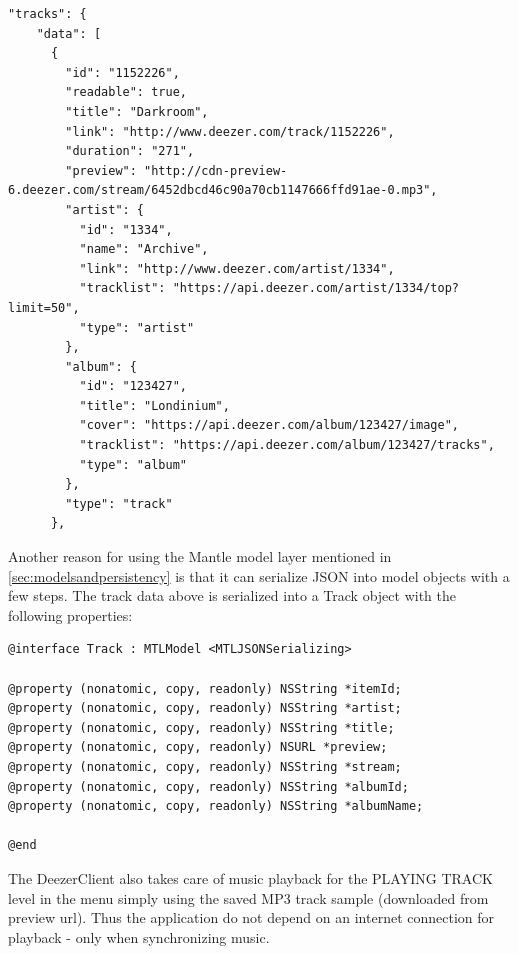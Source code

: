 \begin{lstlisting}
"tracks": {
    "data": [
      {
        "id": "1152226",
        "readable": true,
        "title": "Darkroom",
        "link": "http://www.deezer.com/track/1152226",
        "duration": "271",
        "preview": "http://cdn-preview-6.deezer.com/stream/6452dbcd46c90a70cb1147666ffd91ae-0.mp3",
        "artist": {
          "id": "1334",
          "name": "Archive",
          "link": "http://www.deezer.com/artist/1334",
          "tracklist": "https://api.deezer.com/artist/1334/top?limit=50",
          "type": "artist"
        },
        "album": {
          "id": "123427",
          "title": "Londinium",
          "cover": "https://api.deezer.com/album/123427/image",
          "tracklist": "https://api.deezer.com/album/123427/tracks",
          "type": "album"
        },
        "type": "track"
      },
\end{lstlisting}

Another reason for using the Mantle model layer mentioned in \ref{sec:modelsandpersistency} is that it can serialize JSON into model objects with a few steps. The track data above is serialized into a Track object with the following properties:

\begin{lstlisting}
@interface Track : MTLModel <MTLJSONSerializing>

@property (nonatomic, copy, readonly) NSString *itemId;
@property (nonatomic, copy, readonly) NSString *artist;
@property (nonatomic, copy, readonly) NSString *title;
@property (nonatomic, copy, readonly) NSURL *preview;
@property (nonatomic, copy, readonly) NSString *stream;
@property (nonatomic, copy, readonly) NSString *albumId;
@property (nonatomic, copy, readonly) NSString *albumName;

@end
\end{lstlisting}

The DeezerClient also takes care of music playback for the PLAYING TRACK level in the menu simply using the saved MP3 track sample (downloaded from preview url). Thus the application do not depend on an internet connection for playback - only when synchronizing music.

